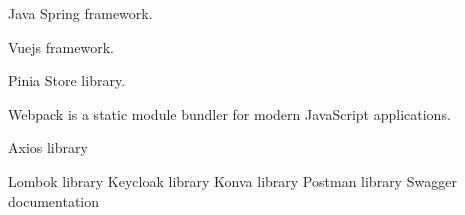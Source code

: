 \documentclass[a4paper,twoside]{article}
\begin{document}
\newpage
\begin{thebibliography}{9}
	Java Spring framework.
	
	Vuejs framework.
	
	Pinia Store library.
	
	 Webpack is a static module bundler for modern JavaScript applications.
	 
	 Axios library
	 
	 Lombok library
	 Keycloak library
	 Konva library
	 Postman library
	 Swagger documentation
\end{thebibliography}
\end{document}

